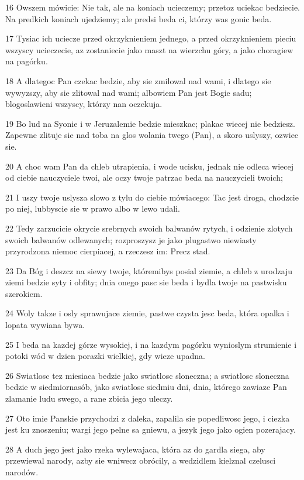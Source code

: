 \par 16 Owszem mówicie: Nie tak, ale na koniach ucieczemy; przetoz uciekac bedziecie. Na predkich koniach ujedziemy; ale predsi beda ci, którzy was gonic beda.
\par 17 Tysiac ich uciecze przed okrzyknieniem jednego, a przed okrzyknieniem pieciu wszyscy ucieczecie, az zostaniecie jako maszt na wierzchu góry, a jako choragiew na pagórku.
\par 18 A dlategoc Pan czekac bedzie, aby sie zmilowal nad wami, i dlatego sie wywyzszy, aby sie zlitowal nad wami; albowiem Pan jest Bogie sadu; blogoslawieni wszyscy, którzy nan oczekuja.
\par 19 Bo lud na Syonie i w Jeruzalemie bedzie mieszkac; plakac wiecej nie bedziesz. Zapewne zlituje sie nad toba na glos wolania twego (Pan), a skoro uslyszy, ozwiec sie.
\par 20 A choc wam Pan da chleb utrapienia, i wode ucisku, jednak nie odleca wiecej od ciebie nauczyciele twoi, ale oczy twoje patrzac beda na nauczycieli twoich;
\par 21 I uszy twoje uslysza slowo z tylu do ciebie mówiacego: Tac jest droga, chodzcie po niej, lubbyscie sie w prawo albo w lewo udali.
\par 22 Tedy zarzucicie okrycie srebrnych swoich balwanów rytych, i odzienie zlotych swoich balwanów odlewanych; rozproszysz je jako plugastwo niewiasty przyrodzona niemoc cierpiacej, a rzeczesz im: Precz stad.
\par 23 Da Bóg i deszcz na siewy twoje, któremibys posial ziemie, a chleb z urodzaju ziemi bedzie syty i obfity; dnia onego pasc sie beda i bydla twoje na pastwisku szerokiem.
\par 24 Woly takze i osly sprawujace ziemie, pastwe czysta jesc beda, która opalka i lopata wywiana bywa.
\par 25 I beda na kazdej górze wysokiej, i na kazdym pagórku wynioslym strumienie i potoki wód w dzien porazki wielkiej, gdy wieze upadna.
\par 26 Swiatlosc tez miesiaca bedzie jako swiatlosc sloneczna; a swiatlosc sloneczna bedzie w siedmiornasób, jako swiatlosc siedmiu dni, dnia, którego zawiaze Pan zlamanie ludu swego, a rane zbicia jego uleczy.
\par 27 Oto imie Panskie przychodzi z daleka, zapalila sie popedliwosc jego, i ciezka jest ku znoszeniu; wargi jego pelne sa gniewu, a jezyk jego jako ogien pozerajacy.
\par 28 A duch jego jest jako rzeka wylewajaca, która az do gardla siega, aby przewiewal narody, azby sie wniwecz obrócily, a wedzidlem kielznal czelusci narodów.
